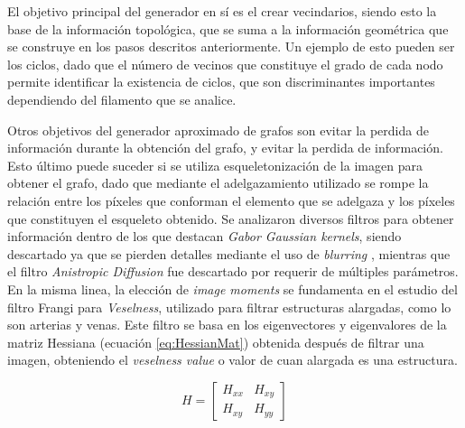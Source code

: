 El objetivo principal del generador en s\'i es el crear vecindarios, siendo esto la base de la informaci\'on topol\'ogica, que se suma a la informaci\'on geom\'etrica que se construye en los pasos descritos anteriormente. Un ejemplo de esto pueden ser los ciclos, dado que el n\'umero de vecinos que constituye el grado de cada nodo permite identificar la existencia de ciclos\cite{wilson1979introduction}, que son discriminantes importantes dependiendo del filamento que se analice. 


Otros objetivos del generador aproximado de grafos son evitar la perdida de informaci\'on durante la obtenci\'on del grafo, y evitar la perdida de informaci\'on. Esto \'ultimo puede suceder si se utiliza esqueletonizaci\'on de la imagen para obtener el grafo, dado que mediante el adelgazamiento utilizado se rompe la relaci\'on entre los p\'ixeles que conforman el elemento que se adelgaza y los p\'ixeles que constituyen el esqueleto obtenido. Se analizaron diversos filtros para obtener informaci\'on dentro de los que destacan {\it Gabor Gaussian kernels}, siendo descartado ya que se pierden detalles mediante el uso de {\it blurring} \cite{kerkeni2016coronary}, mientras que el filtro {\it Anistropic Diffusion} fue descartado por requerir de múltiples parámetros. En la misma linea, la elecci\'on de {\it image moments}\cite{flusser2009moments} se fundamenta en el estudio del filtro Frangi para {\it Veselness}\cite{frangi1998multiscale}\cite{fu2018frangi}, utilizado para filtrar estructuras alargadas, como lo son arterias y venas. Este filtro se basa en los eigenvectores y eigenvalores de la matriz Hessiana (ecuaci\'on \eqref{eq:HessianMat}) obtenida despu\'es de filtrar una imagen, obteniendo el {\it veselness value} o valor de cuan alargada es una estructura. 

\begin{equation}
    \label{eq:HessianMat}
    H = \begin{bmatrix}
        H_{xx} & H_{xy} \\
        H_{xy} & H_{yy} 
        \end{bmatrix}
\end{equation}

